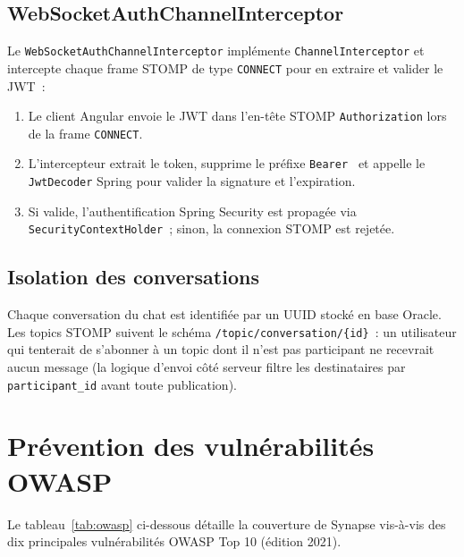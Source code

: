 \subsection{WebSocketAuthChannelInterceptor}

Le \texttt{WebSocketAuthChannelInterceptor} implémente
\texttt{ChannelInterceptor} et intercepte chaque frame STOMP de type
\texttt{CONNECT} pour en extraire et valider le JWT~:

\begin{enumerate}[leftmargin=*,nosep]
  \item Le client Angular envoie le JWT dans l'en-tête STOMP \texttt{Authorization}
        lors de la frame \texttt{CONNECT}.
  \item L'intercepteur extrait le token, supprime le préfixe \texttt{Bearer~} et
        appelle le \texttt{JwtDecoder} Spring pour valider la signature et l'expiration.
  \item Si valide, l’authentification Spring Security est propagée via
        \texttt{SecurityContextHolder}~; sinon, la connexion STOMP est rejetée.
\end{enumerate}

\subsection{Isolation des conversations}

Chaque conversation du chat est identifiée par un UUID stocké en base Oracle.
Les topics STOMP suivent le schéma \texttt{/topic/conversation/\{id\}}~: un
utilisateur qui tenterait de s'abonner à un topic dont il n’est pas participant
ne recevrait aucun message (la logique d'envoi côté serveur filtre les destinataires
par \texttt{participant\_id} avant toute publication).

\section{Prévention des vulnérabilités OWASP}

Le tableau~\ref{tab:owasp} ci-dessous détaille la couverture de Synapse vis-à-vis
des dix principales vulnérabilités OWASP Top 10 (édition 2021).

